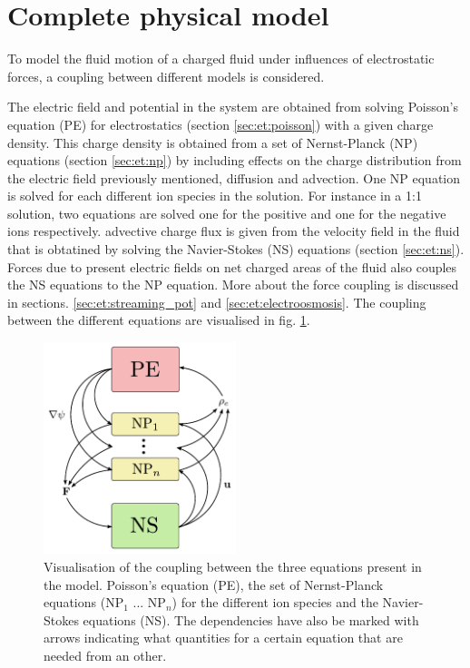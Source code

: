 \section{Complete physical model}\label{sec:et:coupling}
To model the fluid motion of a charged fluid under influences of
electrostatic forces, a coupling between different models is
considered.

The electric field and potential in the system are obtained from
solving Poisson's equation (PE) for electrostatics (section
\ref{sec:et:poisson}) with a given charge density. This charge density
is obtained from a set of Nernst-Planck (NP) equations (section
\ref{sec:et:np}) by including effects on the charge distribution from
the electric field previously mentioned, diffusion and advection. One
NP equation is solved for each different ion species in the
solution. For instance in a 1:1 solution, two equations are solved one
for the positive and one for the negative ions respectively.
advective charge flux is given from the velocity field in the fluid
that is obtatined by solving the Navier-Stokes (NS) equations (section
\ref{sec:et:ns}). Forces due to present electric fields on net charged
areas of the fluid also couples the NS equations to the NP
equation. More about the force coupling is discussed in
sections. \ref{sec:et:streaming_pot} and
\ref{sec:et:electroosmosis}. The coupling between the different
equations are visualised in fig. \ref{fig:coupling}.


\begin{figure}
\begin{center}
\includegraphics[width=0.5\textwidth]{fig/coupling.pdf}
\end{center}
\caption{Visualisation of the coupling between the three equations
  present in the model. Poisson's equation (PE), the set of
  Nernst-Planck equations (NP$_1$ ... NP$_n$) for the different ion
  species and the Navier-Stokes equations (NS). The dependencies have
  also be marked with arrows indicating what quantities for a certain
  equation that are needed from an other.}
\label{fig:coupling}
\end{figure}


